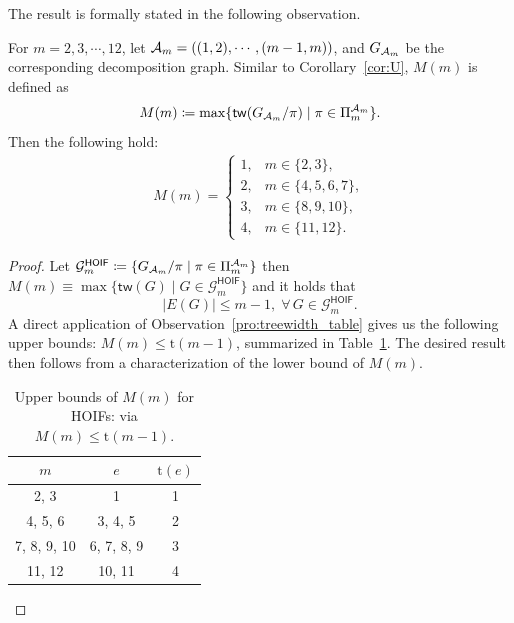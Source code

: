 \documentclass[letterpaper,11pt]{article}
\newcommand{\partition}{\Pi}
\newcommand{\partitionp}[1]{\partition_{#1}}
\newcommand{\treewidthp}[1]{\mathsf{tw}(#1)}
\newcommand{\graphset}{\mathcal{G}}
\begin{document}
\begin{bibunit}[plainnat]
The result is formally stated in the following observation. 
\begin{observation}
\label{obs:HOIF}    
    For $m = 2,3,\cdots, 12$, let ${\mathcal{A}}_{m} = ((1,2),\cdots,(m-1,m))$, and $G_{{\mathcal{A}}_m}$ be the corresponding decomposition graph. Similar to Corollary~\ref{cor:U}, $M(m)$ is defined as 
    \begin{align*}
        M(m) \coloneqq \max \{ \treewidthp{G_{\calA_m} /\pi} \mid \pi \in \partitionp{m}^{\calA_m}\}. 
    \end{align*}
    Then the following hold:
    \begin{equation}
    \label{HOIF_M}
    \begin{split}
    M (m) = \left\{ \begin{array}{ll}
    1, & m \in \{2, 3\}, \\
    2, & m \in \{4, 5, 6, 7\}, \\
    3, & m \in \{8, 9, 10\}, \\
    4, & m \in \{11, 12\}.
    \end{array} \right.
    \end{split}
    \end{equation}
\end{observation}

\begin{proof}
Let $\graphset^{\mathsf{HOIF}}_{m} \coloneqq \{ G_{\calA_m} /\pi \mid \pi \in \partitionp{m}^{\calA_m} \}$ then $M(m) \equiv \max \{ \treewidthp{G} \mid G \in \graphset^{\mathsf{HOIF}}_{m} \}$ and it holds that
\begin{equation*}
| E(G) | \leq m-1, \; \forall \, G \in \graphset^{\mathsf{HOIF}}_{m}.
\end{equation*}
A direct application of Observation~\ref{pro:treewidth_table} gives us the following upper bounds: $M(m) \le \mathrm{t}(m-1)$, summarized in Table~\ref{tab:HOIF_upper_bound}. The desired result then follows from a characterization of the lower bound of $M (m)$.

\begin{table}[ht]
    \centering
    \caption{Upper bounds of $M(m)$ for HOIFs: via $M(m) \leq \mathrm{t}(m-1)$. }
    \label{tab:HOIF_upper_bound}
    \begin{tabular}{ccc}
        \toprule
        $m$ & $e$ & $\mathrm{t}(e)$ \\
        \midrule
        2, 3 & 1 & 1 \\
        4, 5, 6 & 3, 4, 5 & 2 \\
        7, 8, 9, 10 & 6, 7, 8, 9 & 3 \\
        11, 12 & 10, 11 & 4 \\
        \bottomrule
    \end{tabular}
\end{table}


\end{proof}
\end{bibunit}
\end{document}

